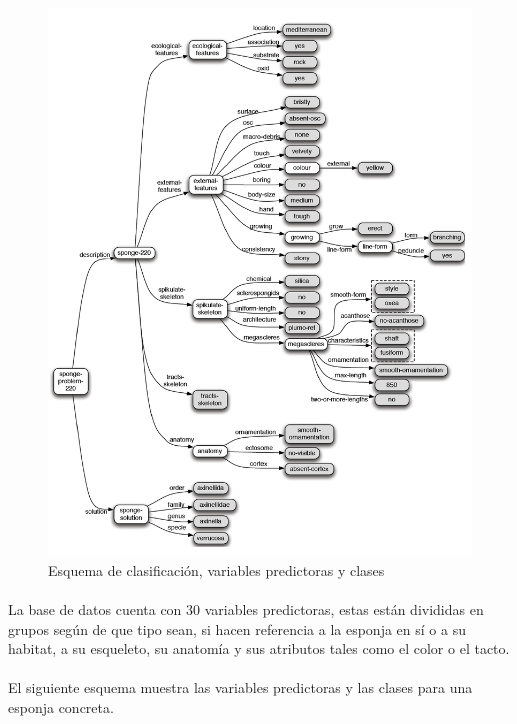 \documentclass[es]{ifirak}
\begin{document}
\begin{figure}[htbp]
	\centering
	\includegraphics[width=1\textwidth]{Esquema.png}
	\caption{Esquema de clasificación, variables predictoras y clases}\label{figure}
\end{figure}

\paragraph{}
La base de datos cuenta con 30 variables predictoras, estas están divididas en grupos según de que tipo sean, si hacen referencia a la esponja en sí o a su habitat, a su esqueleto, su anatomía y sus atributos tales como el color o el tacto.

\paragraph{}
El siguiente esquema muestra las variables predictoras y las clases para una esponja concreta.
\end{document}
